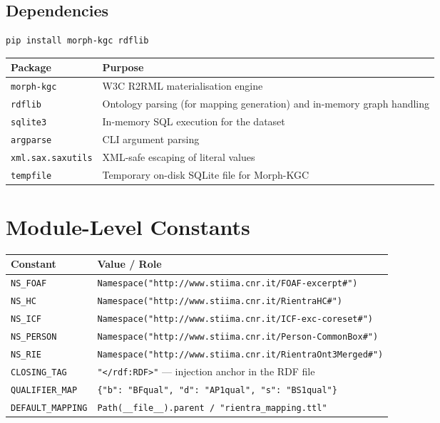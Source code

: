 ﻿\documentclass[12pt,a4paper]{article}
\begin{document}
\subsection{Dependencies}

\begin{lstlisting}
pip install morph-kgc rdflib
\end{lstlisting}

\begin{longtable}{@{}P{4cm}P{10.5cm}@{}}
\toprule
\textbf{Package} & \textbf{Purpose} \\
\midrule
\endhead
\texttt{morph-kgc} & W3C R2RML materialisation engine \\
\texttt{rdflib} & Ontology parsing (for mapping generation) and in-memory graph handling \\
\texttt{sqlite3} & In-memory SQL execution for the dataset \\
\texttt{argparse} & CLI argument parsing \\
\texttt{xml.sax.saxutils} & XML-safe escaping of literal values \\
\texttt{tempfile} & Temporary on-disk SQLite file for Morph-KGC \\
\bottomrule
\end{longtable}

\clearpage
\section{Module-Level Constants}

\begin{longtable}{@{}P{4cm}P{10.5cm}@{}}
\toprule
\textbf{Constant} & \textbf{Value / Role} \\
\midrule
\endhead
\texttt{NS\_FOAF} & \texttt{Namespace("http://www.stiima.cnr.it/FOAF-excerpt\#")} \\
\texttt{NS\_HC} & \texttt{Namespace("http://www.stiima.cnr.it/RientraHC\#")} \\
\texttt{NS\_ICF} & \texttt{Namespace("http://www.stiima.cnr.it/ICF-exc-coreset\#")} \\
\texttt{NS\_PERSON} & \texttt{Namespace("http://www.stiima.cnr.it/Person-CommonBox\#")} \\
\texttt{NS\_RIE} & \texttt{Namespace("http://www.stiima.cnr.it/RientraOnt3Merged\#")} \\
\texttt{CLOSING\_TAG} & \texttt{"</rdf:RDF>"} --- injection anchor in the RDF file \\
\texttt{QUALIFIER\_MAP} & \texttt{\{"b": "BFqual", "d": "AP1qual", "s": "BS1qual"\}} \\
\texttt{DEFAULT\_MAPPING} & \texttt{Path(\_\_file\_\_).parent / "rientra\_mapping.ttl"} \\
\bottomrule
\end{longtable}
\end{document}
